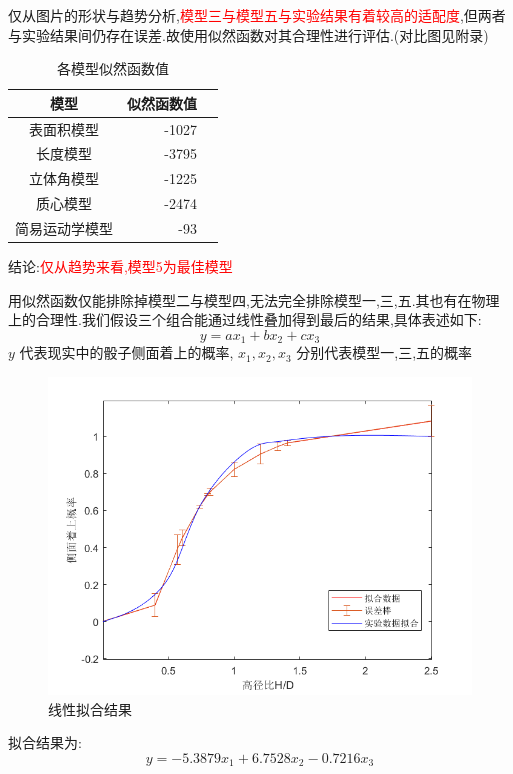 \documentclass[UTF8]{gapd}
\begin{document}
仅从图片的形状与趋势分析,\textcolor{red}{模型三与模型五与实验结果有着较高的适配度},但两者与实验结果间仍存在误差.故使用似然函数对其合理性进行评估.(对比图见附录)
\begin{table}[h]
	\begin{tabular}{|c|r|l}\hline
		模型&似然函数值	\\ \hline
		表面积模型&-1027\\\hline
		长度模型&-3795\\\hline
		立体角模型&-1225\\\hline
		质心模型 &-2474\\\hline
		简易运动学模型 &-93\\\hline    
	\end{tabular}
	\caption{各模型似然函数值}
\end{table}

结论:\textcolor{red}{仅从趋势来看,模型5为最佳模型}

用似然函数仅能排除掉模型二与模型四,无法完全排除模型一,三,五.其也有在物理上的合理性.我们假设三个组合能通过线性叠加得到最后的结果,具体表述如下:
\begin{equation}
y=ax_1+bx_2+cx_3
\end{equation}
  $y$ 代表现实中的骰子侧面着上的概率,  $  x_1,x_2,x_3 $                  分别代表模型一,三,五的概率
  
 \begin{figure}[h]%
 	\centering
 	\includegraphics[width=0.8\columnwidth]{images/线性拟合误差棒}
 	\caption{线性拟合结果}
 	\label{fig:P2}%
 \end{figure}

拟合结果为:
\begin{equation}
y=-5.3879x_1+6.7528x_2-0.7216x_3
\end{equation}
\end{document}
